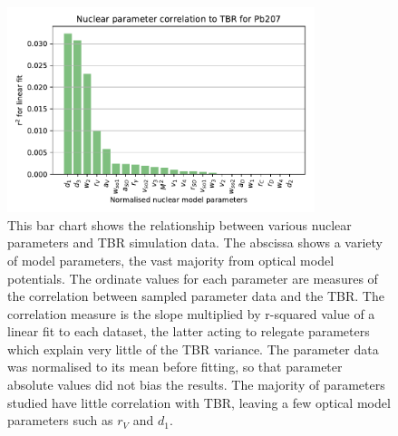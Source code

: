 
\begin{figure}[H]
  \centering
	\includegraphics[width=0.8\textwidth]{Pb207_param_correl}
	\caption[Strength of correlation between $^{207}$Pb nuclear parameters and TBR.]{This bar chart shows the relationship between various nuclear parameters and TBR simulation data. The abscissa shows a variety of model parameters, the vast majority from optical model potentials. The ordinate values for each parameter are measures of the correlation between sampled parameter data and the TBR. The correlation measure is the slope multiplied by r-squared value of a linear fit to each dataset, the latter acting to relegate parameters which explain very little of the TBR variance. The parameter data was normalised to its mean before fitting, so that parameter absolute values did not bias the results. The majority of parameters studied have little correlation with TBR, leaving a few optical model parameters such as $r_{V}$ and $d_{1}$.}
	\label{fig:pb207_param_correl}
\end{figure}

%


